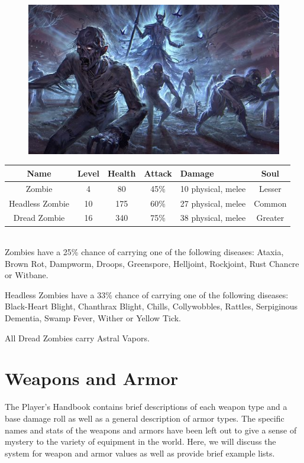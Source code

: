 \documentclass[12pt]{book}
\begin{document}
\begin{figure}[h]
	\centering
	\includegraphics[scale=0.8]{zombiearmy.png}
\end{figure}

\begin{tabular}{|c|c|c|c|p{}|c|}
\hline
Name & Level & Health & Attack & Damage & Soul\\ \hline
Zombie & 4 & 80 & 45\% & 10 physical, melee & Lesser\\ \hline
Headless Zombie & 10 & 175 & 60\% & 27 physical, melee & Common\\ \hline
Dread Zombie & 16 & 340 & 75\% & 38 physical, melee & Greater\\ \hline
\end{tabular}\\

Zombies have a 25\% chance of carrying one of the following diseases: Ataxia, Brown Rot, Dampworm, Droops, Greenspore, Helljoint, Rockjoint, Rust Chancre or Witbane.

Headless Zombies have a 33\% chance of carrying one of the following diseases: Black-Heart Blight, Chanthrax Blight, Chills, Collywobbles, Rattles, Serpiginous Dementia, Swamp Fever, Wither or Yellow Tick.

All Dread Zombies carry Astral Vapors.

\chapter{Weapons and Armor}
The Player's Handbook contains brief descriptions of each weapon type and a base damage roll as well as a general description of armor types. The specific names and stats of the weapons and armors have been left out to give a sense of mystery to the variety of equipment in the world. Here, we will discuss the system for weapon and armor values as well as provide brief example lists.
\end{document}
